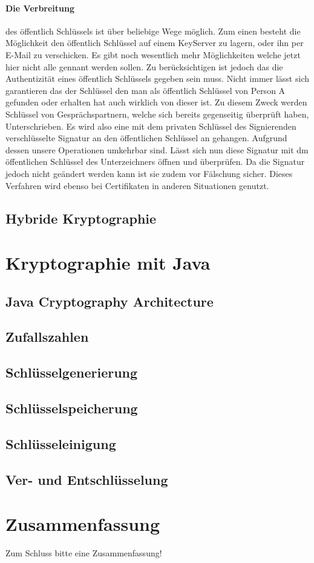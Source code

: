 \documentclass[paper=a4,11pt,german]{scrartcl} %
\begin{document}
\paragraph{Die Verbreitung}
des öffentlich Schlüssels ist über beliebige Wege möglich. Zum einen besteht die Möglichkeit den öffentlich Schlüssel auf einem KeyServer zu lagern, oder ihn per E-Mail zu verschicken. Es gibt noch wesentlich mehr Möglichkeiten welche jetzt hier nicht alle gennant werden sollen. Zu berücksichtigen ist jedoch das die Authentizität eines öffentlich Schlüssels gegeben sein muss. Nicht immer lässt sich garantieren das der Schlüssel den man als öffentlich Schlüssel von Person A gefunden oder erhalten hat auch wirklich von dieser ist. Zu diesem Zweck werden Schlüssel von Gesprächspartnern, welche sich bereits gegenseitig überprüft haben, Unterschrieben. Es wird also eine mit dem privaten Schlüssel des Signierenden verschlüsselte Signatur an den öffentlichen Schlüssel an gehangen. Aufgrund dessen unsere Operationen umkehrbar sind. Lässt sich nun diese Signatur mit dm öffentlichen Schlüssel des Unterzeichners öffnen und überprüfen. Da die Signatur jedoch nicht geändert werden kann ist sie zudem vor Fälschung sicher. Dieses Verfahren wird ebenso bei Certifikaten in anderen Situationen genutzt. 

\subsection{Hybride Kryptographie}


\section{Kryptographie mit Java}
\subsection{Java Cryptography Architecture}

\subsection{Zufallszahlen}

\subsection{Schlüsselgenerierung}

\subsection{Schlüsselspeicherung}

\subsection{Schlüsseleinigung}

\subsection{Ver- und Entschlüsselung}

\section{Zusammenfassung}
Zum Schluss bitte eine Zusammenfassung!



\end{document}
